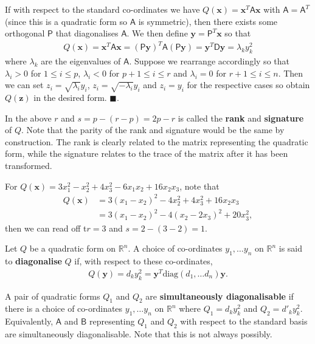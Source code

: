 \documentclass[letter-paper]{tufte-book}
\newenvironment{proof}[1][Proof]{\begin{trivlist}
\item[\hskip \labelsep {\bfseries #1}]}{\end{trivlist}}
\newenvironment{example}[1][Example]{\begin{trivlist}
\item[\hskip \labelsep {\bfseries #1}]}{\end{trivlist}}
\newcommand{\As}{{\mathsf{A}}}
\newcommand{\Bs}{{\mathsf{B}}}
\newcommand{\Ds}{{\mathsf{D}}}
\newcommand{\Ps}{{\mathsf{P}}}
\newcommand{\xb}{{\boldsymbol{x}}}
\newcommand{\yb}{{\boldsymbol{y}}}
\newcommand{\zb}{{\boldsymbol{z}}}
\newcommand{\qed}{\hfill$\blacksquare$}
\begin{document}
\begin{proof}
  If with respect to the standard co-ordinates we have $Q(\xb) = \xb^T \As \xb$ with $\As = \As^T$ (since this is a quadratic form so $\As$ is symmetric), then there exists some orthogonal $\Ps$ that diagonalises $\As$. We then define $\yb = \Ps^T \xb$ so that
  \begin{align*}
    Q(\xb) = \xb^T \As \xb = (\Ps\yb)^T \As (\Ps \yb) = \yb^T \Ds \yb = \lambda_k y_k^2
  \end{align*}
  where $\lambda_k$ are the eigenvalues of $\As$. Suppose we rearrange accordingly so that $\lambda_i > 0$ for $1\leq i \leq p$, $\lambda_i < 0$ for $p+1 \leq i \leq r$ and $\lambda_i = 0$ for $r+1 \leq i \leq n$. Then we can set $z_i = \sqrt{\lambda_i}y_i$, $z_i = \sqrt{-\lambda_i}y_i$ and $z_i = y_i$ for the respective cases so obtain $Q(\zb)$ in the desired form. \qed.
\end{proof}

In the above $r$ and $s = p - (r-p) = 2p - r$ is called the \textbf{rank} and \textbf{signature} of $Q$. Note that the parity of the rank and signature would be the same by construction. The rank is clearly related to the matrix representing the quadratic form, while the signature relates to the trace of the matrix after it has been transformed.

\begin{example}
  For $Q(\xb) = 3x_1^2 - x_2^2 + 4x_3^2 - 6x_1 x_2 + 16 x_2 x_3$, note that
  \begin{align*}
    Q(\xb)
      &= 3(x_1 - x_2)^2 - 4x_2^2 + 4x_3^2 + 16x_2 x_3\\
      &= 3(x_1 - x_2)^2 - 4(x_2 - 2x_3)^2 + 20 x_3^2,
  \end{align*}
  then we can read off t$r=3$ and $s = 2 - (3 - 2) = 1$.
\end{example}

Let $Q$ be a quadratic form on $\mathbb{R}^n$. A choice of co-ordinates $y_1, \ldots y_n$ on $\mathbb{R}^n$ is said to \textbf{diagonalise} $Q$ if, with respect to these co-ordinates,
\begin{align*}
  Q(\yb) = d_k y_k^2 = \yb^T \mbox{diag}(d_1, \ldots d_n)\yb.
\end{align*}

A pair of quadratic forms $Q_1$ and $Q_2$ are \textbf{simultaneously diagonalisable} if there is a choice of co-ordinates $y_1, \ldots y_n$ on $\mathbb{R}^n$ where $Q_1 = d_k y_k^2$ and $Q_2 = d'_k y_k^2$. Equivalently, $\As$ and $\Bs$ representing $Q_1$ and $Q_2$ with respect to the standard basis are simultaneously diagonalisable. Note that this is not always possibly.
\end{document}
